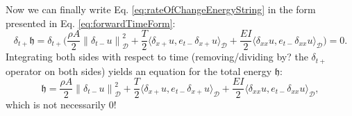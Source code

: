 \documentclass{article}
\begin{document}
Now we can finally write Eq. \eqref{eq:rateOfChangeEnergyString} in the form presented in Eq. \eqref{eq:forwardTimeForm}:
\begin{equation}
    \delta_{t+}\mathfrak{h} = \delta_{t+}\Bigg(\frac{\rho A}{2}\left\lVert\delta_{t-}u\right\rVert_\mathcal{D}^2 + \frac{T}{2}\langle\delta_{x+}u, e_{t-}\delta_{x+}u\rangle_\mathcal{D} +\frac{EI}{2}\langle\delta_{xx}u,e_{t-}\delta_{xx}u\rangle_\mathcal{D}\Bigg) = 0.
\end{equation}
Integrating both sides with respect to time (removing/dividing by? the $\delta_{t+}$ operator on both sides) yields an equation for the total energy $\mathfrak{h}$:
\begin{equation}\label{eq:totEnergyString}
    \mathfrak{h} = \frac{\rho A}{2}\left\lVert\delta_{t-}u\right\rVert_\mathcal{D}^2 + \frac{T}{2}\langle\delta_{x+}u, e_{t-}\delta_{x+}u\rangle_\mathcal{D} +\frac{EI}{2}\langle\delta_{xx}u,e_{t-}\delta_{xx}u\rangle_\mathcal{D},
\end{equation}
which is not necessarily 0! %
\end{document}
